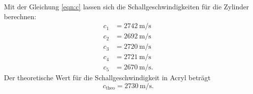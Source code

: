 \noindent Mit der Gleichung \eqref{eqn:c} lassen sich die Schallgeschwindigkeiten
für die Zylinder berechnen:
\begin{align*}
    c_1 &= \SI{2742}{\meter\per\second} \\
    c_2 &= \SI{2692}{\meter\per\second} \\
    c_3 &= \SI{2720}{\meter\per\second} \\
    c_4 &= \SI{2721}{\meter\per\second} \\
    c_5 &= \SI{2670}{\meter\per\second}.
\end{align*}
Der theoretische Wert für die Schallgeschwindigkeit in Acryl \cite{c} beträgt
\begin{equation*}
    c_{\text{theo}} = \SI{2730}{\meter\per\second}.
\end{equation*}

